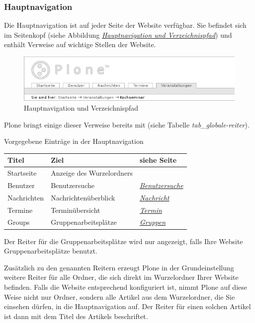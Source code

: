 \documentclass[a4paper,12pt,ngerman]{manual}
\begin{document}
\subsubsection{Hauptnavigation}

Die Hauptnavigation ist auf jeder Seite der Website verfügbar. Sie befindet
sich im Seitenkopf (siehe Abbildung \hyperlink{fig-globale-reiter}{\emph{Hauptnavigation und Verzeichnispfad}}) und
enthält Verweise auf wichtige Stellen der Website.
\hypertarget{fig-globale-reiter}{}\begin{figure}[htbp]
\centering

\includegraphics{globale-reiter.png}
\caption{Hauptnavigation und Verzeichnispfad}\end{figure}

Plone bringt einige dieser Verweise bereits mit (siehe
Tabelle \emph{tab\_globale-reiter}).

Vorgegebene Einträge in der Hauptnavigation
\hypertarget{tab-globale-reiter}{}
\begin{tabulary}{\textwidth}{|L|L|L|}
\hline
\textbf{
Titel
} & \textbf{
Ziel
} & \textbf{
siehe Seite
}\\
\hline

Startseite
 & 
Anzeige des Wurzelordners
 & \\

Benutzer
 & 
Benutzersuche
 & 
\hyperlink{sec-mitgliedersuche}{\emph{Benutzersuche}}
\\

Nachrichten
 & 
Nachrichtenüberblick
 & 
\hyperlink{sec-nachricht}{\emph{Nachricht}}
\\

Termine
 & 
Terminübersicht
 & 
\hyperlink{sec-termin}{\emph{Termin}}
\\

Groups
 & 
Gruppenarbeitsplätze
 & 
\hyperlink{sec-gruppen}{\emph{Gruppen}}
\\
\hline
\end{tabulary}


Der Reiter für die Gruppenarbeitsplätze wird nur angezeigt, falls Ihre
Website Gruppenarbeitsplätze benutzt.

Zusätzlich zu den genannten Reitern erzeugt Plone in der
Grundeinstellung weitere Reiter für alle Ordner, die sich direkt im
Wurzelordner Ihrer Website befinden. Falls die Website entsprechend
konfiguriert ist, nimmt Plone auf diese Weise nicht nur Ordner,
sondern alle Artikel aus dem Wurzelordner, die Sie einsehen dürfen, in
die Hauptnavigation auf. Der Reiter für einen solchen Artikel ist dann
mit dem Titel des Artikels beschriftet.
\hypertarget{sec-navigation-portlet}{}
\end{document}
